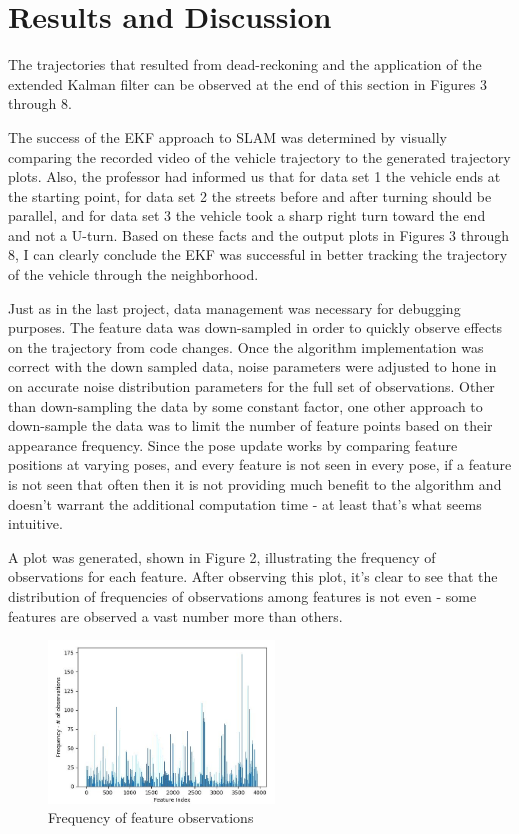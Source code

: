 \documentclass[conference]{IEEEtran}
\begin{document}
\section{Results and Discussion}

The trajectories that resulted from dead-reckoning and the application of the extended Kalman filter can be observed at the end of this section in Figures 3 through 8.

The success of the EKF approach to SLAM was determined by visually comparing the recorded video of the vehicle trajectory to the generated trajectory plots. Also, the professor had informed us that for data set 1 the vehicle ends at the starting point, for data set 2 the streets before and after turning should be parallel, and for data set 3 the vehicle took a sharp right turn toward the end and not a U-turn. Based on these facts and the output plots in Figures 3 through 8, I can clearly conclude the EKF was successful in better tracking the trajectory of the vehicle through the neighborhood.

Just as in the last project, data management was necessary for debugging purposes. The feature data was down-sampled in order to quickly observe effects on the trajectory from code changes. Once the algorithm implementation was correct with the down sampled data, noise parameters were adjusted to hone in on accurate noise distribution parameters for the full set of observations. Other than down-sampling the data by some constant factor, one other approach to down-sample the data was to limit the number of feature points based on their appearance frequency. Since the pose update works by comparing feature positions at varying poses, and every feature is not seen in every pose, if a feature is not seen that often then it is not providing much benefit to the algorithm and doesn't warrant the additional computation time - at least that's what seems intuitive.

A plot was generated, shown in Figure 2, illustrating the frequency of observations for each feature. After observing this plot, it's clear to see that the distribution of frequencies of observations among features is not even - some features are observed a vast number more than others. 

\begin{figure}[H]
\centerline{\includegraphics[width=60mm]{eqns/frequencyplot.jpg}}
\caption{Frequency of feature observations}
\end{figure} 
\end{document}
